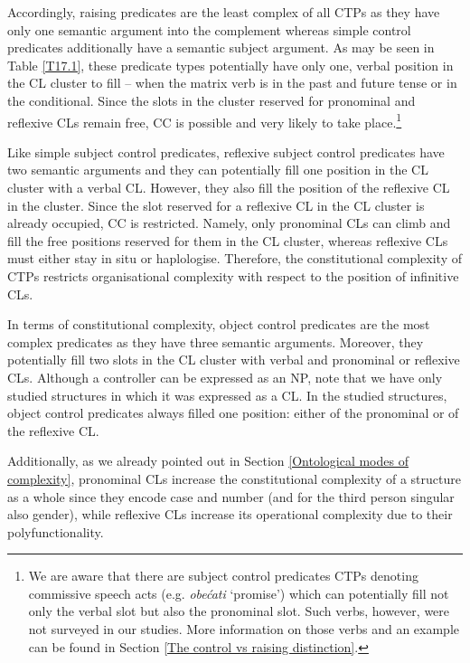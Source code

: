 Accordingly, raising predicates are the least complex of all CTPs as they have only one semantic argument into the complement whereas simple control predicates additionally have a semantic subject argument. As may be seen in Table \ref{T17.1}, these predicate types potentially have only one, verbal position in the CL cluster to fill – when the matrix verb is in the past and future tense or in the conditional. Since the slots in the cluster reserved for pronominal and reflexive CLs remain free, CC is possible and very likely to take place.\footnote{We are aware that there are subject control predicates CTPs denoting commissive speech acts (e.g. \textit{obećati} ‘promise’) which can potentially fill not only the verbal slot but also the pronominal slot. Such verbs, however, were not surveyed in our studies. More information on those verbs and an example can be found in Section \ref{The control vs raising distinction}.} 

\begin{sloppypar}
Like simple subject control predicates, reflexive subject control predicates have two semantic arguments and they can potentially fill one position in the CL cluster with a verbal CL. However, they also fill the position of the reflexive CL in the cluster. Since the slot reserved for a reflexive CL in the CL cluster is already occupied, CC is restricted. Namely, only pronominal CLs can climb and fill the free positions reserved for them in the CL cluster, whereas reflexive CLs must either stay in situ or haplologise. Therefore, the constitutional complexity of CTPs restricts organisational complexity with respect to the position of infinitive CLs.
\end{sloppypar}

In terms of constitutional complexity, object control predicates are the most complex predicates as they have three semantic arguments. Moreover, they potentially fill two slots in the CL cluster with verbal and pronominal or reflexive CLs. Although a controller can be expressed as an NP, note that we have only studied structures in which it was expressed as a CL. In the studied structures, object control predicates always filled one position: either of the pronominal or of the reflexive CL. 

Additionally, as we already pointed out in Section \ref{Ontological modes of complexity}, pronominal CLs increase the constitutional complexity of a structure as a whole since they encode case and number (and for the third person singular also gender), while reflexive CLs increase its operational complexity due to their polyfunctionality. 


